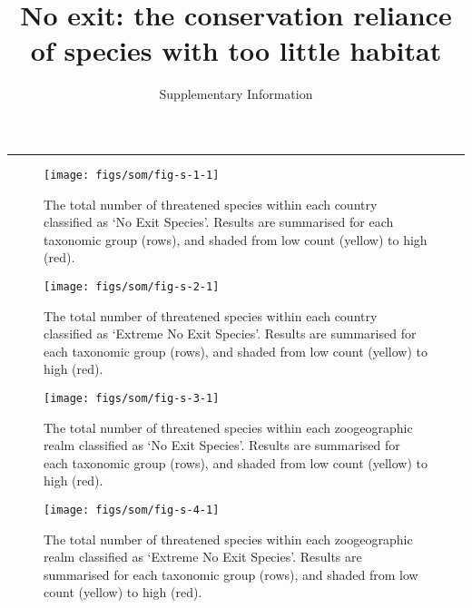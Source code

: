 \documentclass[
  12pt,
  a4paper,
]{article}
\title{No exit: the conservation reliance of species with too little habitat}
\subtitle{Supplementary Information}
\author{}
\date{\vspace{-2.5em}}
\newcommand{\beginsupplement}{\setcounter{table}{0}  \renewcommand{\tablename}{Supplementary Table} \setcounter{figure}{0} \renewcommand{\figurename}{Supplementary Figure}}
\begin{document}
\maketitle

\begin{center}\rule{0.5\linewidth}{0.5pt}\end{center}

\pagebreak
\raggedright
\beginsupplement

\pagebreak



\begin{figure}

{\centering \texttt{[image: figs/som/fig-s-1-1]} 

}

\caption{The total number of threatened species within each country classified as `No Exit Species'. Results are summarised for each taxonomic group (rows), and shaded from low count (yellow) to high (red).}\label{fig:fig-s-1}
\end{figure}

\pagebreak



\begin{figure}

{\centering \texttt{[image: figs/som/fig-s-2-1]} 

}

\caption{The total number of threatened species within each country classified as `Extreme No Exit Species'. Results are summarised for each taxonomic group (rows), and shaded from low count (yellow) to high (red).}\label{fig:fig-s-2}
\end{figure}

\pagebreak



\begin{figure}

{\centering \texttt{[image: figs/som/fig-s-3-1]} 

}

\caption{The total number of threatened species within each zoogeographic realm classified as `No Exit Species'. Results are summarised for each taxonomic group (rows), and shaded from low count (yellow) to high (red).}\label{fig:fig-s-3}
\end{figure}

\pagebreak



\begin{figure}

{\centering \texttt{[image: figs/som/fig-s-4-1]} 

}

\caption{The total number of threatened species within each zoogeographic realm classified as `Extreme No Exit Species'. Results are summarised for each taxonomic group (rows), and shaded from low count (yellow) to high (red).}\label{fig:fig-s-4}
\end{figure}
\end{document}
